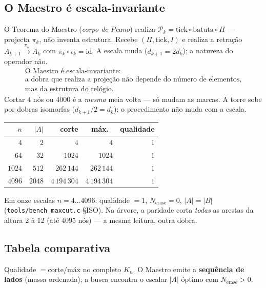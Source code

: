 \documentclass[11pt,a4paper]{article}
\newcommand{\code}[1]{\texttt{\small #1}}
\begin{document}
\subsection*{O Maestro é escala-invariante}

O Teorema do Maestro (\emph{corpo de Peano}) realiza
$\mathcal{P}_k=\mathrm{tick}\circ\mathrm{batuta}\circ\Pi$ --- projecta $\pi_k$, não inventa
estrutura. Recebe $(\Pi,\mathrm{tick},I)$ e realiza a retração
$A_{k+1}\xrightarrow{\pi_k}A_k$ com $\pi_k\circ\iota_k=\mathrm{id}$. A escala muda
($d_{k+1}=2d_k$); a natureza do operador não.
\[
\boxed{
\begin{array}{c}
\text{O Maestro é escala-invariante:}
\\[0.25em]
\text{a dobra que realiza a projeção não depende do número de elementos,}
\\
\text{mas da estrutura do relógio.}
\end{array}
}
\]
Cortar $4$ nós ou $4000$ é a \emph{mesma} meia volta --- só mudam as marcas. A torre sobe por
dobras isomorfas ($d_{k+1}/2=d_k$); o procedimento não muda com a escala.

\begin{center}\small
\begin{tabular}{@{}rrrrr@{}}
\toprule
$n$ & $|A|$ & corte & máx.\ & qualidade \\
\midrule
$4$ & $2$ & $4$ & $4$ & $1$ \\
$64$ & $32$ & $1024$ & $1024$ & $1$ \\
$1024$ & $512$ & $262\,144$ & $262\,144$ & $1$ \\
$4096$ & $2048$ & $4\,194\,304$ & $4\,194\,304$ & $1$ \\
\bottomrule
\end{tabular}
\end{center}

\noindent Em onze escalas $n=4\ldots4096$: qualidade $=1$, $N_{\mathrm{erase}}=0$, $|A|=|B|$
(\code{tools/bench\_maxcut.c} §ISO). Na árvore, a paridade corta \emph{todas} as arestas da altura
$2$ à $12$ (até $4095$ nós) --- a mesma leitura, outra dobra.

\subsection*{Tabela comparativa}

Qualidade $=\mathrm{corte}/\mathrm{máx}$ no completo $K_n$. O Maestro emite a \textbf{sequência de
lados} (massa ordenada); a busca encontra o escalar $|A|$ óptimo com $N_{\mathrm{erase}}>0$.
\end{document}
